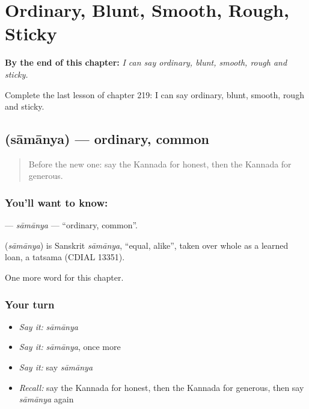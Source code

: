
\chapter{Ordinary, Blunt, Smooth, Rough, Sticky}
\label{ch:ka-ordinary-blunt-smooth-rough-sticky}

\begin{chapteropening}
\textbf{By the end of this chapter:} \emph{I can say ordinary, blunt, smooth, rough and sticky.}

Complete the last lesson of chapter 219: I can say ordinary, blunt, smooth, rough and sticky.
\end{chapteropening}

\section[\texorpdfstring{\kn{ಸಾಮಾನ್ಯ} (sāmānya)}{ಸಾಮಾನ್ಯ (sāmānya)}]{ (sāmānya) — ordinary, common}

\label{lesson:KA-C219-samanya}



\begin{quote}
Before the new one: say the Kannada for honest, then the Kannada for generous.
\end{quote}

\subsection*{You'll want to know: }
\textbf{} — \emph{sāmānya} — \textquotedblleft{}ordinary, common\textquotedblright{}.

\begin{cousinweb}
\textbf{} (\emph{sāmānya}) is Sanskrit \emph{sāmānya}, \textquotedblleft{}equal, alike\textquotedblright{}, taken over whole as a learned loan, a tatsama (CDIAL 13351).
\end{cousinweb}

\begin{grammarlens}[title={What you've built}]
One more word for this chapter.
\end{grammarlens}

\subsection*{Your turn}
\begin{itemize}
\raggedright
  \item \emph{Say it:} \emph{sāmānya}
  \item \emph{Say it:} \emph{sāmānya}, once more
  \item \emph{Say it:} say \emph{sāmānya}
  \item \emph{Recall:} say the Kannada for honest, then the Kannada for generous, then say \emph{sāmānya} again
\end{itemize}

